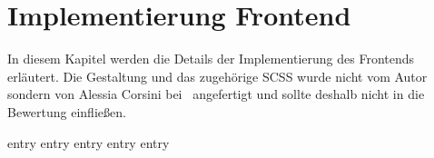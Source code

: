 \chapter{Implementierung Frontend}
\label{chap:implementierung_frontend}

In diesem Kapitel werden die Details der Implementierung des Frontends
erläutert.  Die Gestaltung und das zugehörige SCSS wurde nicht vom Autor
sondern von Alessia Corsini bei \mesods~angefertigt und sollte deshalb nicht in
die Bewertung einfließen.

{entry}
{entry}
{entry}
{entry}
{entry}
